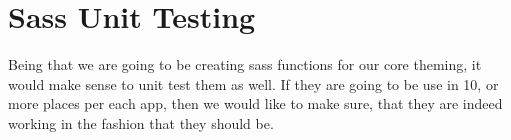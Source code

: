 \maketitle{}
\section{ Sass Unit Testing }

Being that we are going to be creating sass functions for our core theming, it
would make sense to unit test them as well. If they are going to be use in 10,
or more places per each app, then we would like to make sure, that they are
indeed working in the fashion that they should be.

